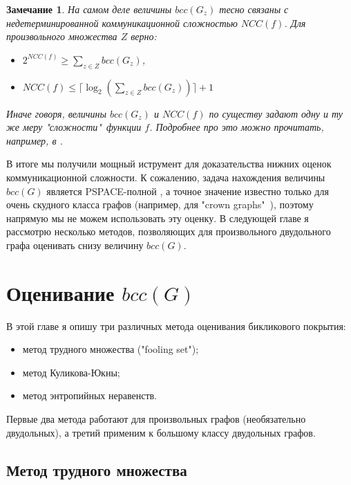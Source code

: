 \documentclass[a4paper]{article}
\newtheorem*{mremark}{Замечание}
\begin{document}
\begin{mremark}
    На самом деле величины $bcc(G_z)$ тесно связаны с недетерминированной коммуникационной сложностью 
    $NCC(f)$. Для произвольного множества $Z$ верно:
    \begin{itemize}[noitemsep]
        \item $2^{NCC(f)}\geq \sum\limits_{z\in Z}bcc(G_z)$,
        \item $NCC(f) \leq \lceil \log_2(\sum\limits_{z\in Z}bcc(G_z))\rceil + 1$
    \end{itemize}
    Иначе говоря, величины $bcc(G_z)$ и $NCC(f)$ по существу задают одну и ту же меру "сложности"\ функции $f$. 
    Подробнее про это можно прочитать, например, в \cite{Razborov}.
\end{mremark}

В итоге мы получили мощный иструмент для доказательства нижних оценок коммуникационной сложности. 
К сожалению, задача нахождения величины $bcc(G)$ является PSPACE-полной \cite{HermannMarkus}, а точное 
значение известно только для очень скудного класса графов (например, для "crown graphs"\ \cite{CrownGraph}), поэтому 
напрямую мы не можем использовать эту оценку. В следующей главе я рассмотрю несколько методов, 
позволяющих для произвольного двудольного графа оценивать снизу величину $bcc(G)$.


\addtocounter{section}{1}
\section*{Оценивание $bcc(G)$}

В этой главе я опишу три различных метода оценивания бикликового покрытия:
\begin{itemize}[noitemsep]
	\item метод трудного множества ("fooling set");
	\item метод Куликова-Юкны;
	\item метод энтропийных неравенств.
\end{itemize}

Первые два метода работают для произвольных графов (необязательно двудольных), а третий применим к 
большому классу двудольных графов.

\setcounter{subsection}{0}

\subsection{Метод трудного множества}
\end{document}
